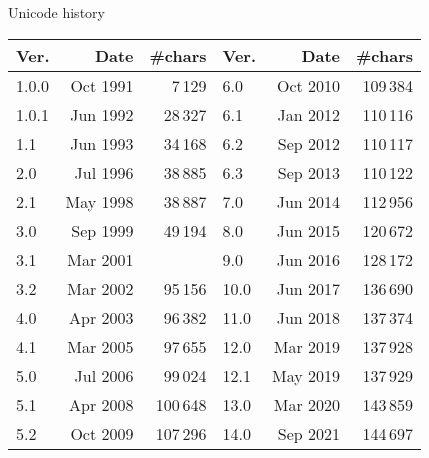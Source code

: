 \documentclass[handout]{beamer}
\begin{document}
\begin{frame}{Unicode history}

\def\p{\phantom{0}}
\begin{table}[c]
\begin{tabular}{lrr@{~~~~}|@{~~~~}lrr}
Ver. & Date     & \#chars & Ver. & Date     & \#chars \\
\hline
1.0.0 & Oct 1991 &   7\,129 &  \p6.0 & Oct 2010 & 109\,384 \\
1.0.1 & Jun 1992 &  28\,327 &  \p6.1 & Jan 2012 & 110\,116 \\
1.1   & Jun 1993 &  34\,168 &  \p6.2 & Sep 2012 & 110\,117 \\
2.0   & Jul 1996 &  38\,885 &  \p6.3 & Sep 2013 & 110\,122 \\
2.1   & May 1998 &  38\,887 &  \p7.0 & Jun 2014 & 112\,956 \\
3.0   & Sep 1999 &  49\,194 &  \p8.0 & Jun 2015 & 120\,672 \\
3.1   & Mar 2001 &  \color{red}{94\,140} &  \p9.0 & Jun 2016 & 128\,172 \\
3.2   & Mar 2002 &  95\,156 &  10.0  & Jun 2017 & 136\,690 \\
4.0   & Apr 2003 &  96\,382 &  11.0  & Jun 2018 & 137\,374 \\
4.1   & Mar 2005 &  97\,655 &  12.0  & Mar 2019 & 137\,928 \\
5.0   & Jul 2006 &  99\,024 &  12.1  & May 2019 & 137\,929 \\
5.1   & Apr 2008 & 100\,648 &  13.0  & Mar 2020 & 143\,859 \\
5.2   & Oct 2009 & 107\,296 &  14.0  & Sep 2021 & 144\,697 \\
\end{tabular}
\end{table}

\end{frame}
\end{document}

